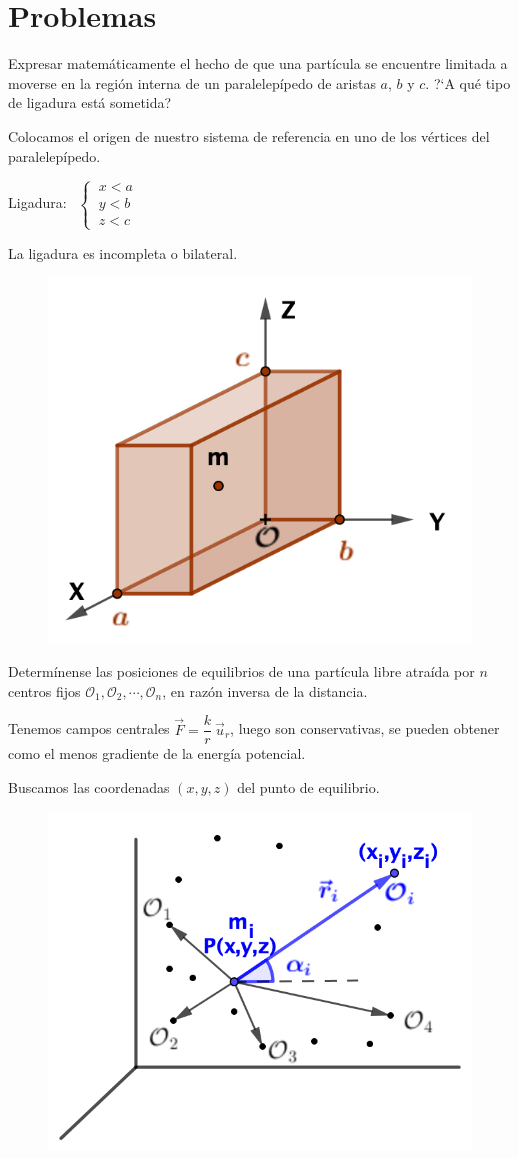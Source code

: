 \section{Problemas}
\begin{prob}
Expresar matemáticamente el hecho de que una partícula se encuentre limitada a moverse en la región interna de un paralelepípedo de aristas $a$, $b$ y $c$. ?`A qué tipo de ligadura está sometida?	
\end{prob}
\begin{multicols}{2}
Colocamos el origen de nuestro sistema de referencia en uno de los vértices del paralelepípedo.

Ligadura: $\ \ \begin{cases} \ x<a \\ \ y<b \\ \ z < c \end{cases}$

La ligadura es incompleta o bilateral.
\begin{figure}[H]
	\centering
	\includegraphics[width=.4\textwidth]{imagenes/imagenes05/T05IM06.png}
\end{figure}
\end{multicols}

\begin{prob}
Determínense las posiciones de equilibrios de una partícula libre atraída por $n$ centros fijos $\mathcal O_1,\mathcal O_2, \cdots , \mathcal O_n$, en razón inversa de la distancia.
\end{prob}
\begin{multicols}{2}
Tenemos campos centrales $\vec F=\dfrac k r \ \vec u_r$, luego son conservativas, se pueden obtener como el menos gradiente de la energía potencial.

Buscamos las coordenadas $(x,y,z)$ del punto de equilibrio.

\begin{figure}[H]
	\centering
	\includegraphics[width=.4\textwidth]{imagenes/imagenes05/T05IM07.png}
\end{figure}
\end{multicols}

